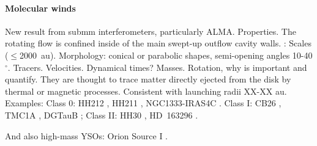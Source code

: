 \documentclass[12pt]{mythesis}
\begin{document}
\paragraph*{Molecular winds}%


New result from submm interferometers, particularly ALMA. Properties. The rotating flow is confined inside of the main swept-up outflow cavity walls.
\citep[Review]{pascucci2023}:
Scales ($\leq$2000~au).
Morphology: conical or parabolic shapes, semi-opening angles 10-40$^\circ$.
Tracers.
Velocities.
Dynamical times?
Masses.
Rotation, why is important and quantify.
They are thought to trace matter directly ejected from the disk by thermal or magnetic processes.
Consistent with launching radii XX-XX au.
Examples: 
Class 0: HH212 \citep{tabone2017, lee2018_HH212, tabone2020, lee2021},
HH211 \citep{lee2018_HH211},
NGC1333-IRAS4C \citep{zhang2018}.
Class I: 
CB26 \citep{launhardt2009, launhardt2023, lopez-vazquez2023},
TMC1A \citep{bjerkeli2016},
DGTauB \citep{zapata2015, devalon2020, garufi2020, devalon2022};
Class II:
HH30 \citep{louvet2018},
HD~163296 \citep{booth2021}.

And also high-mass YSOs: Orion Source I \citep{hirota2017, lopez-vazquez2020}.
\end{document}
